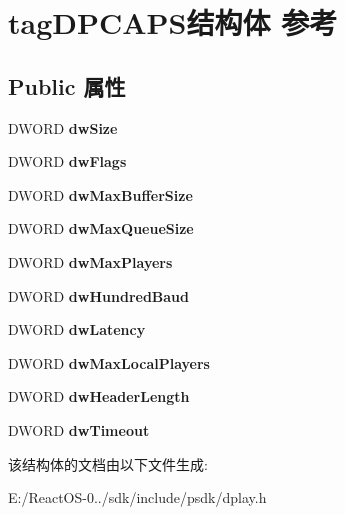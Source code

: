 \hypertarget{structtag_d_p_c_a_p_s}{}\section{tag\+D\+P\+C\+A\+P\+S结构体 参考}
\label{structtag_d_p_c_a_p_s}
\subsection*{Public 属性}
\begin{DoxyCompactItemize}
\item 
\mbox{\label{structtag_d_p_c_a_p_s_a00be314c6b7ffdd9caeab50af6c60b49}} 
D\+W\+O\+RD {\bfseries dw\+Size}
\item 
\mbox{\label{structtag_d_p_c_a_p_s_a06a20329f9d98cfd7998eb89b0a92b1d}} 
D\+W\+O\+RD {\bfseries dw\+Flags}
\item 
\mbox{\label{structtag_d_p_c_a_p_s_a17c86f80b90c9602508d7264e67eb598}} 
D\+W\+O\+RD {\bfseries dw\+Max\+Buffer\+Size}
\item 
\mbox{\label{structtag_d_p_c_a_p_s_a68bf041b6d09b6e445b25aa5c3dd3b09}} 
D\+W\+O\+RD {\bfseries dw\+Max\+Queue\+Size}
\item 
\mbox{\label{structtag_d_p_c_a_p_s_a0fc1f2178cb31514fbb252d27cbad99a}} 
D\+W\+O\+RD {\bfseries dw\+Max\+Players}
\item 
\mbox{\label{structtag_d_p_c_a_p_s_a15e7c56898ab976630f28c3f66ae6c92}} 
D\+W\+O\+RD {\bfseries dw\+Hundred\+Baud}
\item 
\mbox{\label{structtag_d_p_c_a_p_s_a52a9948f0590bf7d9202c9ab4cbb5686}} 
D\+W\+O\+RD {\bfseries dw\+Latency}
\item 
\mbox{\label{structtag_d_p_c_a_p_s_a3783c6d372799a6ae23196cab94de625}} 
D\+W\+O\+RD {\bfseries dw\+Max\+Local\+Players}
\item 
\mbox{\label{structtag_d_p_c_a_p_s_a86cec14c5ad461f1f00a021effdeb3d8}} 
D\+W\+O\+RD {\bfseries dw\+Header\+Length}
\item 
\mbox{\label{structtag_d_p_c_a_p_s_a7535bb06ec025c04554e22d0b66eb6ea}} 
D\+W\+O\+RD {\bfseries dw\+Timeout}
\end{DoxyCompactItemize}


该结构体的文档由以下文件生成\+:\begin{DoxyCompactItemize}
\item 
E\+:/\+React\+O\+S-\/0../sdk/include/psdk/dplay.\+h\end{DoxyCompactItemize}
